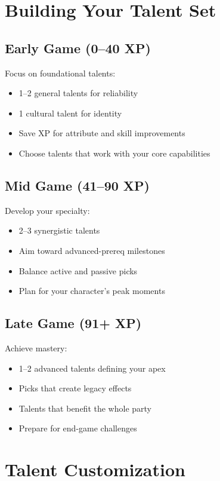 \begin{multicols}{2}
\section{Building Your Talent Set}

\subsection*{Early Game (0--40 XP)}
Focus on foundational talents:
\begin{itemize}
\item 1--2 general talents for reliability
\item 1 cultural talent for identity
\item Save XP for attribute and skill improvements
\item Choose talents that work with your core capabilities
\end{itemize}

\subsection*{Mid Game (41--90 XP)}
Develop your specialty:
\begin{itemize}
\item 2--3 synergistic talents
\item Aim toward advanced-prereq milestones
\item Balance active and passive picks
\item Plan for your character's peak moments
\end{itemize}

\subsection*{Late Game (91+ XP)}
Achieve mastery:
\begin{itemize}
\item 1--2 advanced talents defining your apex
\item Picks that create legacy effects
\item Talents that benefit the whole party
\item Prepare for end-game challenges
\end{itemize}

\section{Talent Customization}


\end{multicols}
